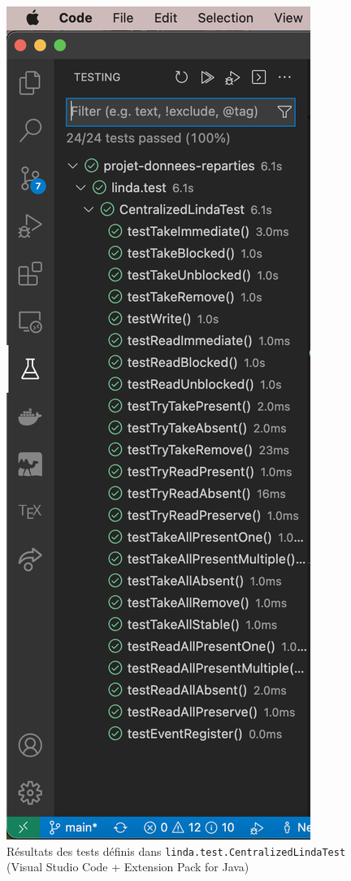 \documentclass[headings=standardclasses,parskip=half]{scrartcl}
\begin{document}
\begin{figure}[h]
    \centering
    \includegraphics[scale=0.5]{tests-results.png}
    \caption{Résultats des tests définis dans
        \texttt{linda.test.CentralizedLindaTest}\\
        (Visual Studio Code + Extension Pack for Java)}
\end{figure}
\end{document}
